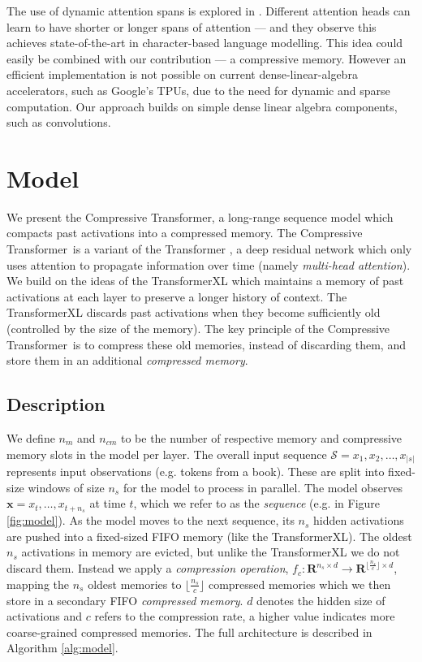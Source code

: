 The use of dynamic attention spans is explored in \citet{sukhbaatar2019adaptive}. Different attention heads can learn to have shorter or longer spans of attention --- and they observe this achieves state-of-the-art in character-based language modelling. This idea could easily be combined with our contribution --- a compressive memory. However an efficient implementation is not possible on current dense-linear-algebra accelerators, such as Google's TPUs, due to the need for dynamic and sparse computation. Our approach builds on simple dense linear algebra components, such as convolutions.
\section{Model}

We present the Compressive Transformer, a long-range sequence model which compacts past activations into a compressed memory. The Compressive Transformer~is a variant of the Transformer \citep{vaswani2017attention}, a deep residual network which only uses attention to propagate information over time (namely \textit{multi-head attention}). We build on the ideas of the TransformerXL \citep{dai2019transformer} which maintains a memory of past activations at each layer to preserve a longer history of context. The TransformerXL discards past activations when they become sufficiently old (controlled by the size of the memory). The key principle of the Compressive Transformer~is to compress these old memories, instead of discarding them, and store them in an additional \textit{compressed memory}. 

\subsection{Description}
We define $n_m$ and $n_{cm}$ to be the number of respective memory and compressive memory slots in the model per layer. The overall input sequence $\mathcal{S} = x_1, x_2, \ldots, x_{|s|}$ represents input observations (e.g. tokens from a book). These are split into fixed-size windows of size $n_s$ for the model to process in parallel. The model observes $\mathbf{x} = x_t, \ldots, x_{t+n_s}$ at time $t$, which we refer to as the \textit{sequence} (e.g. in Figure \ref{fig:model}). As the model moves to the next sequence, its $n_s$ hidden activations are pushed into a fixed-sized FIFO memory (like the TransformerXL). The oldest $n_s$ activations in memory are evicted, but unlike the TransformerXL we do not discard them. Instead we apply a \textit{compression operation}, $f_c : \mathbf{R}^{n_s \times d} \rightarrow \mathbf{R}^{\lfloor{\frac{n_s}{c}\rfloor} \times d}$, mapping the $n_s$ oldest memories to $\lfloor{\frac{n_s}{c}}\rfloor$ compressed memories which we then store in a secondary FIFO \textit{compressed memory}. $d$ denotes the hidden size of activations and $c$ refers to the compression rate, a higher value indicates more coarse-grained compressed memories. The full architecture is described in Algorithm \ref{alg:model}.

